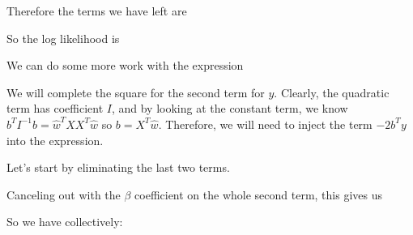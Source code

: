 \documentclass[12pt]{article}
\begin{document}

Therefore the terms we have left are


So the log likelihood is


We can do some more work with the expression


We will complete the square for the second term for $y$. Clearly, the quadratic term has coefficient $I$, and by looking at the constant term, we know $b^T I^{-1} b = \hat w^T XX^T \hat w$ so $b = X^T \hat w$. Therefore, we will need to inject the term $-2 b^T y$ into the expression.



Let's start by eliminating the last two terms.


Canceling out with the $\beta$ coefficient on the whole second term, this gives us

So we have collectively:
\end{document}
